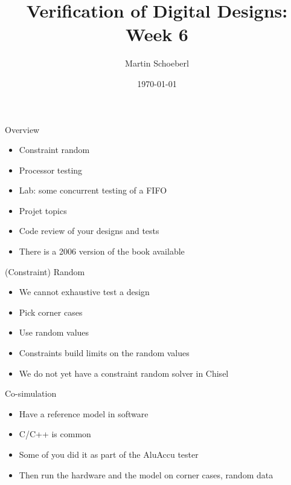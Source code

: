 

\newif\ifbook


\title{Verification of Digital Designs: Week 6}
\author{Martin Schoeberl}
\date{\today}



\begin{frame}
\titlepage
\end{frame}

\begin{frame}[fragile]{Overview}
\begin{itemize}
\item Constraint random
\item Processor testing
\item Lab: some concurrent testing of a FIFO
\item Projet topics
\item Code review of your designs and tests
\item There is a 2006 version of the book available
\end{itemize}
\end{frame}

\begin{frame}[fragile]{(Constraint) Random}
\begin{itemize}
\item We cannot exhaustive test a design
\item Pick corner cases
\item Use random values
\item Constraints build limits on the random values
\item We do not yet have a constraint random solver in Chisel
\end{itemize}
\end{frame}

\begin{frame}[fragile]{Co-simulation}
\begin{itemize}
\item Have a reference model in software
\item C/C++ is common
\item Some of you did it as part of the AluAccu tester
\item Then run the hardware and the model on corner cases, random data
\end{itemize}
\end{frame}

